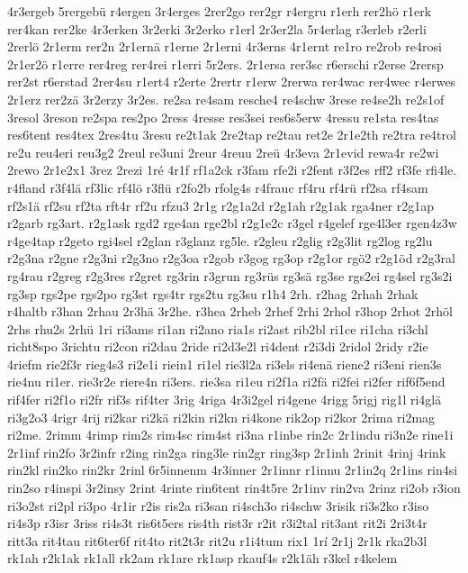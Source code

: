 {4r3ergeb
5rergebü
r4ergen
3r4erges
2rer2go
rer2gr
r4ergru
r1erh
rer2hö
r1erk
rer4kan
rer2ke
4r3erken
3r2erki
3r2erko
r1erl
2r3er2la
5r4erlag
r3erleb
r2erli
2rerlö
2r1erm
rer2n
2r1ernä
r1erne
2r1erni
4r3erns
4r1ernt
re1ro
re2rob
re4rosi
2r1er2ö
r1erre
rer4reg
rer4rei
r1erri
5r2ers.
2r1ersa
rer3sc
r6erschi
r2erse
2rersp
rer2st
r6erstad
2rer4su
r1ert4
r2erte
2rertr
r1erw
2rerwa
rer4wac
rer4wec
r4erwes
2r1erz
rer2zä
3r2erzy
3r2es.
re2sa
re4sam
resche4
re4schw
3rese
re4se2h
re2s1of
3resol
3reson
re2spa
res2po
2ress
4resse
res3sei
res6s5erw
4ressu
re1sta
res4tas
res6tent
res4tex
2res4tu
3resu
re2t1ak
2re2tap
re2tau
ret2e
2r1e2th
re2tra
re4trol
re2u
reu4eri
reu3g2
2reul
re3uni
2reur
4reuu
2reü
4r3eva
2r1evid
rewa4r
re2wi
2rewo
2r1e2x1
3rez
2rezi
1ré
4r1f
rf1a2ck
r3fam
rfe2i
r2fent
r3f2es
rff2
rf3fe
rfi4le.
r4fland
r3f4lä
rf3lic
rf4lö
r3flü
r2fo2b
rfolg4s
r4frauc
rf4ru
rf4rü
rf2sa
rf4sam
rf2s1ä
rf2su
rf2ta
rft4r
rf2u
rfzu3
2r1g
r2g1a2d
r2g1ah
r2g1ak
rga4ner
r2g1ap
r2garb
rg3art.
r2g1ask
rgd2
rge4an
rge2bl
r2g1e2c
r3gel
r4gelef
rge4l3er
rgen4z3w
r4ge4tap
r2geto
rgi4sel
r2glan
r3glanz
rg5le.
r2gleu
r2glig
r2g3lit
rg2log
rg2lu
r2g3na
r2gne
r2g3ni
r2g3no
r2g3oa
r2gob
r3gog
rg3op
r2g1or
rgö2
r2g1öd
r2g3ral
rg4rau
r2greg
r2g3res
r2gret
rg3rin
r3grun
rg3rüs
rg3sä
rg3se
rgs2ei
rg4sel
rg3s2i
rg3sp
rgs2pe
rgs2po
rg3st
rgs4tr
rgs2tu
rg3su
r1h4
2rh.
r2hag
2rhah
2rhak
r4haltb
r3han
2rhau
2r3hä
3r2he.
r3hea
2rheb
2rhef
2rhi
2rhol
r3hop
2rhot
2rhöl
2rhs
rhu2s
2rhü
1ri
ri3ams
ri1an
ri2ano
ria1s
ri2ast
rib2bl
ri1ce
ri1cha
ri3chl
richt8spo
3richtu
ri2con
ri2dau
2ride
ri2d3e2l
ri4dent
r2i3di
2ridol
2ridy
r2ie
4riefm
rie2f3r
rieg4s3
ri2e1i
riein1
ri1el
rie3l2a
ri3els
ri4enä
riene2
ri3eni
rien3s
rie4nu
ri1er.
rie3r2e
riere4n
ri3ers.
rie3sa
ri1eu
ri2f1a
ri2fä
ri2fei
ri2fer
rif6f5end
rif4fer
ri2f1o
ri2fr
rif3s
rif4ter
3rig
4riga
4r3i2gel
ri4gene
4rigg
5rigj
rig1l
ri4glä
ri3g2o3
4rigr
4rij
ri2kar
ri2kä
ri2kin
ri2kn
ri4kone
rik2op
ri2kor
2rima
ri2mag
ri2me.
2rimm
4rimp
rim2s
rim4sc
rim4st
ri3na
r1inbe
rin2c
2r1indu
ri3n2e
rine1i
2r1inf
rin2fo
3r2infr
r2ing
rin2ga
ring3le
rin2gr
ring3sp
2r1inh
2rinit
4rinj
4rink
rin2kl
rin2ko
rin2kr
2rinl
6r5innenm
4r3inner
2r1innr
r1innu
2r1in2q
2r1ins
rin4si
rin2so
r4inspi
3r2insy
2rint
4rinte
rin6tent
rin4t5re
2r1inv
rin2va
2rinz
ri2ob
r3ion
ri3o2st
ri2pl
ri3po
4r1ir
r2is
ris2a
ri3san
ri4sch3o
ri4schw
3risik
ri3s2ko
r3iso
ri4s3p
r3isr
3riss
ri4s3t
ris6t5ers
ris4th
rist3r
r2it
r3i2tal
rit3ant
rit2i
2ri3t4r
ritt3a
rit4tau
rit6ter6f
rit4to
rit2t3r
rit2u
r1i4tum
rix1
1rí
2r1j
2r1k
rka2b3l
rk1ah
r2k1ak
rk1all
rk2am
rk1are
rk1asp
rkauf4s
r2k1äh
r3kel
r4kelem
}
